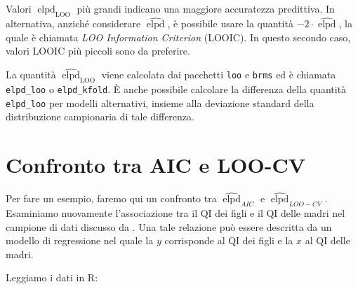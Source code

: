 \documentclass[
  11pt,
]{krantz}
\makeatletter
\newenvironment{Shaded}{\begin{snugshade}}{\end{snugshade}}
\newcommand{\CommentTok}[1]{\textcolor[rgb]{0.37,0.37,0.37}{\textit{#1}}}
\newcommand{\DecValTok}[1]{\textcolor[rgb]{0.06,0.06,0.06}{#1}}
\newcommand{\FunctionTok}[1]{\textcolor[rgb]{0,0,0}{#1}}
\newcommand{\NormalTok}[1]{#1}
\newcommand{\OtherTok}[1]{\textcolor[rgb]{0.37,0.37,0.37}{#1}}
\newcommand{\SpecialCharTok}[1]{\textcolor[rgb]{0,0,0}{#1}}
\newcommand{\StringTok}[1]{\textcolor[rgb]{0.5,0.5,0.5}{#1}}
\newenvironment{kframe}{%
\medskip{}
\setlength{\fboxsep}{.8em}
 \def\at@end@of@kframe{}%
 \ifinner\ifhmode%
  \def\at@end@of@kframe{\end{minipage}}%
  \begin{minipage}{\columnwidth}%
 \fi\fi%
 \def\FrameCommand##1{\hskip\@totalleftmargin \hskip-\fboxsep
 \colorbox{shadecolor}{##1}\hskip-\fboxsep
     \hskip-\linewidth \hskip-\@totalleftmargin \hskip\columnwidth}%
 \MakeFramed {\advance\hsize-\width
   \@totalleftmargin\z@ \linewidth\hsize
   \@setminipage}}%
 {\par\unskip\endMakeFramed%
 \at@end@of@kframe}
\renewenvironment{Shaded}{\begin{kframe}}{\end{kframe}}
\DeclareMathOperator{\elpd}{elpd} %
\DeclareMathOperator{\LOO}{LOO} %
\newcommand{\R}{\textsf{R}} %
\theoremstyle{definition}
\theoremstyle{definition}
\theoremstyle{definition}
\theoremstyle{definition}
\theoremstyle{remark}
\makeatother
\begin{document}
Valori \(\widehat{\elpd}_{\LOO}\) più grandi indicano una maggiore accuratezza predittiva. In alternativa, anziché considerare \(\widehat{\elpd}\), è possibile usare la quantità \(-2 \cdot \widehat{\elpd}\), la quale è chiamata \emph{LOO Information Criterion} (LOOIC). In questo secondo caso, valori LOOIC più piccoli sono da preferire.

La quantità \(\widehat{\elpd}_{\LOO}\) viene calcolata dai pacchetti \texttt{loo} e \texttt{brms} ed è chiamata \texttt{elpd\_loo} o \texttt{elpd\_kfold}. È anche possibile calcolare la differenza della quantità \texttt{elpd\_loo} per modelli alternativi, insieme alla deviazione standard della distribuzione campionaria di tale differenza.

\hypertarget{confronto-tra-aic-e-loo-cv}{%
\section{Confronto tra AIC e LOO-CV}\label{confronto-tra-aic-e-loo-cv}}

Per fare un esempio, faremo qui un confronto tra \(\widehat{\elpd}_{AIC}\) e \(\widehat{\elpd}_{LOO-CV}\). Esaminiamo nuovamente l'associazione tra il QI dei figli e il QI delle madri nel campione di dati discusso da \citet{gelman2020regression}. Una tale relazione può essere descritta da un modello di regressione nel quale la \(y\) corrisponde al QI dei figli e la \(x\) al QI delle madri.

Leggiamo i dati in \R:

\begin{Shaded}
\end{Shaded}
\end{document}
